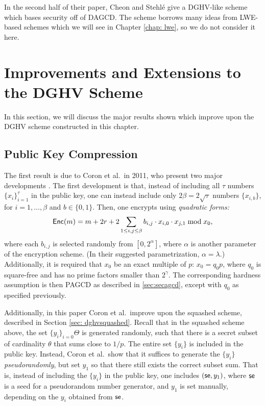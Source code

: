        In the second half of their paper, Cheon and Stehl\'e give a DGHV-like scheme which bases security off of DAGCD. The scheme borrows many ideas from LWE-based schemes which we will see in Chapter \ref{chap: lwe}, so we do not consider it here.

\section{Improvements and Extensions to the DGHV Scheme} \label{sec:dghvimprovements}
    In this section, we will discuss the major results shown which improve upon the DGHV scheme constructed in this chapter.

    \subsection{Public Key Compression}

    The first result is due to Coron et al.~in 2011, who present two major developments \cite{Coron2011}. The first development is that, instead of including all $\tau$ numbers $\{x_i\}_{i = 1}^\tau$ in the public key, one can instead include only $2 \beta = 2 \sqrt{\tau}$ numbers $\{x_{i, b}\}$, for $i = 1, \dots, \beta $ and $b \in \{0, 1\}$. Then, one encrypts using \emph{quadratic forms:}
    \[{\sf Enc}(m) = m + 2r + 2 \sum_{1 \leq i,j \leq \beta} b_{i,j} \cdot x_{i, 0} \cdot x_{j ,1} \bmod x_0,\]
    where each $b_{i, j}$ is selected randomly from $[0, 2^{\alpha}]$, where $\alpha$ is another parameter of the encryption scheme. (In their suggested parametrization, $\alpha = \lambda$.) Additionally, it is required that $x_0$ be an exact multiple of $p$: $x_0 = q_0 p$, where $q_0$ is square-free and has no prime factors smaller than $2^\gamma$. The corresponding hardness assumption is then PAGCD as described in \ref{sec:secagcd}, except with $q_0$ as specified previously.

    Additionally, in this paper Coron et al.~improve upon the squashed scheme, described in Section \ref{sec: dghvsquashed}. Recall that in the squashed scheme above, the set $\{y_i\}_{i = 0}{\Theta}$ is generated randomly, such that there is a secret subset of cardinality $\theta$ that sums close to $1/p$. The entire set $\{y_i\}$ is included in the public key. Instead, Coron et al.~show that it suffices to generate the $\{y_i\}$ \emph{pseudorandomly}, but set $y_1$ so that there still exists the correct subset sum. That is, instead of including the $\{y_i\}$ in the public key, one includes $({\sf se}, y_1)$, where ${\sf se}$ is a seed for a pseudorandom number generator, and $y_1$ is set manually, depending on the $y_i$ obtained from ${\sf se}$.

